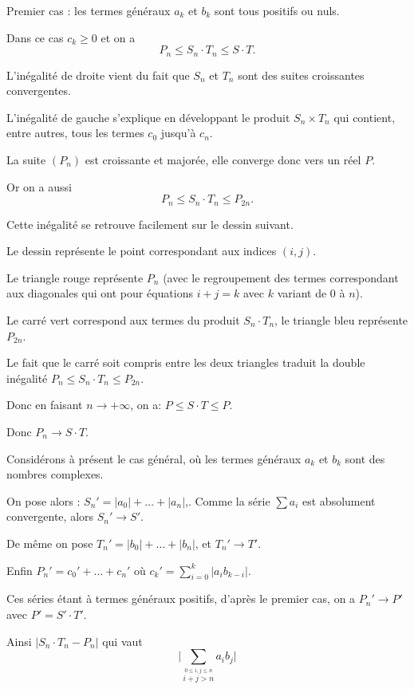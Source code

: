 Premier cas : les termes généraux $a_k$ et $b_k $ sont tous positifs ou nuls. 

\change
Dans ce cas $c_k\ge 0$ et on a 
$$P_n \le S_n \cdot T_n\le S \cdot T.$$ 


L'inégalité de droite vient du fait que $S_n$ et $T_n$ sont des suites croissantes convergentes.

L'inégalité de gauche s'explique en développant le produit $S_n \times T_n$ qui contient, entre autres,
tous les termes $c_0$ jusqu'à $c_n$.

\change
La suite $(P_n)$ est croissante et majorée, elle converge donc vers un réel $P$.

\change
Or on a aussi 
$$P_n \le S_n \cdot T_n \le P_{2n}.$$

\change
Cette inégalité se retrouve facilement sur le dessin suivant.

Le dessin représente le point correspondant aux indices $(i,j)$.

Le triangle rouge représente  $P_n$ (avec le regroupement des termes correspondant aux diagonales qui ont pour équations $i+j=k$ avec $k$ variant de $0$ à $n$). 

Le carré vert correspond aux termes du produit $S_n \cdot T_n$, 
le triangle bleu représente  $P_{2n}$. 

Le fait que le carré soit compris entre les deux triangles traduit la double inégalité $P_n \le S_n \cdot T_n \le P_{2n}$.

\change
Donc en faisant $n\to+\infty$, on a: $P\le S \cdot T\le P$. 

\change
Donc $P_n\to S \cdot T$.

\diapo

Considérons à présent le cas général, où les termes généraux $a_k$ et $b_k$ sont des nombres complexes.

\change
On pose alors :
$S_n'=|a_0|+\dots+|a_n|$,. Comme la série $\sum  a_i$ est absolument convergente, alors $S_n'\to S'$.

\change  
De même on pose $T_n'=|b_0|+\dots+|b_n|$, et $T_n'\to T'$.

\change  
Enfin $P_n'= c_0'+\dots+ c_n'$ o\`u $c_k'=\sum_{i=0}^k|a_ib_{k-i}|$.

\change
Ces séries étant à termes généraux positifs, d'après le premier cas, on a $P_n'\to P'$ avec $P'=S' \cdot T'$. 

\change
Ainsi $|S_n \cdot T_n - P_n|$
qui vaut 
$$\bigl|\sum_{\stackrel{0\le i,j\le n}{i+j>n}} a_ib_j\bigr|$$

